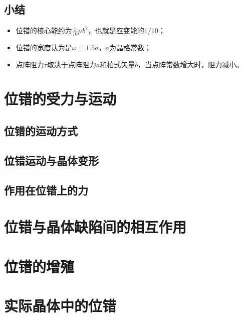             \subsection{小结}
            \begin{itemize}
                \item 位错的核心能约为$\frac{1}{10}\mu b^2$，也就是应变能的$1/10$；
                \item 位错的宽度认为是$\omega=1.5a$，$a$为晶格常数；
                \item 点阵阻力$\tau$取决于点阵阻力$a$和柏式矢量$b$，当点阵常数增大时，阻力减小。
            \end{itemize}
        \section{位错的受力与运动}
            \subsection{位错的运动方式}
            \subsection{位错运动与晶体变形}
            \subsection{作用在位错上的力}

        \section{位错与晶体缺陷间的相互作用}
        \section{位错的增殖}
        \section{实际晶体中的位错}
        